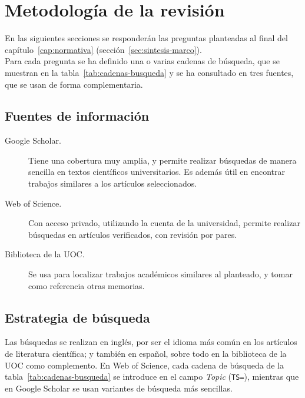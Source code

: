 \label{cap:estado-arte}

\section{Metodología de la revisión}
\label{sec:metodo-revision}
En las siguientes secciones se responderán las preguntas planteadas al final del capítulo~\ref{cap:normativa} (sección~\ref{sec:sintesis-marco}).
\\

Para cada pregunta se ha definido una o varias cadenas de búsqueda, que se muestran en la tabla~\ref{tab:cadenas-busqueda} y se ha consultado en tres fuentes, que se usan de forma complementaria.
\\

\subsection{Fuentes de información}
\label{subsec:fuentes-revision}

\begin{description}
  \item[Google Scholar.] Tiene una cobertura muy amplia, y permite realizar búsquedas de manera sencilla en textos científicos universitarios.
  Es además útil en encontrar trabajos similares a los artículos seleccionados.
  \item[Web of Science.] Con acceso privado, utilizando la cuenta de la universidad, permite realizar búsquedas en artículos verificados, con revisión por pares.
  \item[Biblioteca de la UOC.] Se usa para localizar trabajos académicos similares al planteado, y tomar como referencia otras memorias.
\end{description}

\subsection{Estrategia de búsqueda}
\label{subsec:estrategia-busqueda}

Las búsquedas se realizan en inglés, por ser el idioma más común en los artículos de literatura científica; y también en español, sobre todo en la biblioteca de la UOC como complemento.
En Web of Science, cada cadena de búsqueda de la tabla~\ref{tab:cadenas-busqueda} se introduce en el campo \textit{Topic} (\texttt{TS=}), mientras que en Google Scholar se usan variantes de búsqueda más sencillas.

